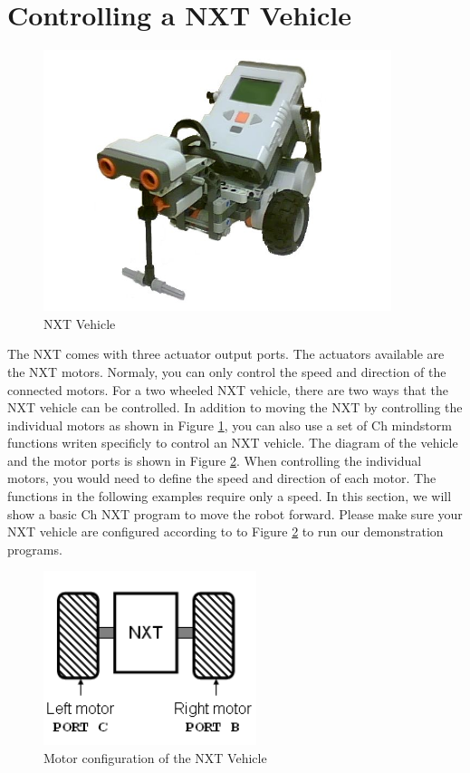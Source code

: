 \documentclass[11pt]{article}
\begin{document}
\section{Controlling a NXT Vehicle}
\begin{figure}[H]
  \begin{center}
    \includegraphics[height=3in]{figure/mindstorm/NXT_vehicle.png}
    \caption{NXT Vehicle\label{fig_NXT_vehicle}}
  \end{center}
\end{figure}

The NXT comes with three actuator output ports. The actuators available are the 
NXT motors. Normaly, you can only control the speed and direction of the connected 
motors. For a two wheeled NXT vehicle, there are two ways that the NXT vehicle can 
be controlled.  In addition to moving the NXT by controlling the individual motors 
as shown in Figure \ref{fig_NXT_vehicle}, you can also use a set of Ch mindstorm 
functions writen specificly to control an NXT vehicle. The diagram of the vehicle 
and the motor ports is shown in Figure \ref{fig_NXT_vehport}. When controlling the 
individual motors, you would need to define the speed and direction of each motor.
The functions in the following examples require only a speed. In this section, we 
will show a basic Ch NXT program to move the robot forward. Please make sure your 
NXT vehicle are configured according to to Figure \ref{fig_NXT_vehport} to run our 
demonstration programs.
\begin{figure}[h]
  \begin{center}
    \includegraphics[height=2in]{figure/mindstorm/Vehicle.png}
    \caption{Motor configuration of the NXT Vehicle \label{fig_NXT_vehport}}
  \end{center}
\end{figure}
\end{document}
